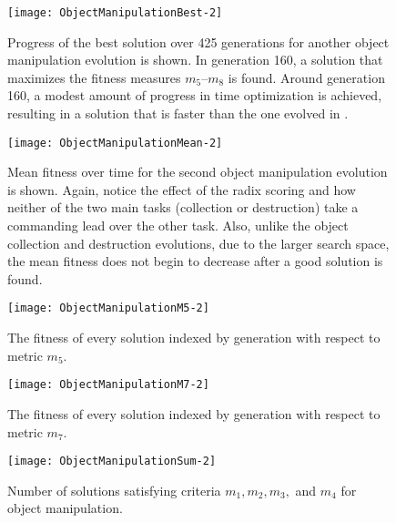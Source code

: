 \begin{figure}[f]
  \centering
  \texttt{[image: ObjectManipulationBest-2]}
  \caption[Progress of the best solution for another object manipulation evolution.]{Progress of the best solution over 425 generations for another object manipulation evolution is shown.  In generation 160, a solution that maximizes the fitness measures $m_5$--$m_8$ is found.  Around generation 160, a modest amount of progress in time optimization is achieved, resulting in a solution that is faster than the one evolved in .}
  \label{fig:ManipulationBest2}
%
  \texttt{[image: ObjectManipulationMean-2]}
  \caption[Mean fitness over time for the second object manipulation evolution.]{Mean fitness over time for the second object manipulation evolution is shown.  Again, notice the effect of the radix scoring and how neither of the two main tasks (collection or destruction) take a commanding lead over the other task.  Also, unlike the object collection and destruction evolutions, due to the larger search space, the mean fitness does not begin to decrease after a good solution is found.}
  \label{fig:ManipulationMean2}
\end{figure}

\begin{figure}[f]
  \centering

  \texttt{[image: ObjectManipulationM5-2]}
  \caption{The fitness of every solution indexed by generation with respect to metric $m_5$.}
  \label{fig:ManipulationM5-second}

  \vspace{.05\textheight}

  \texttt{[image: ObjectManipulationM7-2]}
  \caption{The fitness of every solution indexed by generation with respect to metric $m_7$.}
  \label{fig:ManipulationM7-second}
\end{figure}

\begin{figure}[f]
  \centering
  \texttt{[image: ObjectManipulationSum-2]}
  \caption{Number of solutions satisfying criteria $m_1, m_2, m_3,$
    and $m_4$ for object manipulation.}
  \label{fig:ManipulationSum}
\end{figure}
